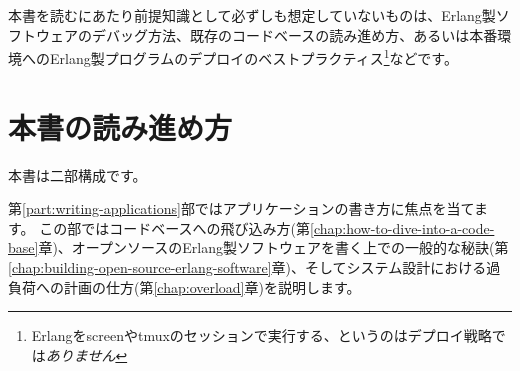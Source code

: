 本書を読むにあたり前提知識として必ずしも想定していないものは、Erlang製ソフトウェアのデバッグ方法、既存のコードベースの読み進め方、あるいは本番環境へのErlang製プログラムのデプロイのベストプラクティス\footnote{Erlangをscreenやtmuxのセッションで実行する、というのはデプロイ戦略では\emph{ありません}}などです。

\section*{本書の読み進め方}
\label{sec:how-to-read-this-book}

本書は二部構成です。

第\ref{part:writing-applications}部ではアプリケーションの書き方に焦点を当てます。
この部ではコードベースへの飛び込み方(第\ref{chap:how-to-dive-into-a-code-base}章)、オープンソースのErlang製ソフトウェアを書く上での一般的な秘訣(第\ref{chap:building-open-source-erlang-software}章)、そしてシステム設計における過負荷への計画の仕方(第\ref{chap:overload}章)を説明します。

